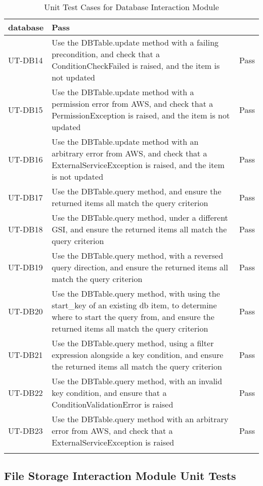 \documentclass[12pt, titlepage]{article}
\begin{document}
\begin{longtable}{|m{2cm}|m{10cm}|m{1.4cm}|}
  database & Pass\\ \hline
  UT-DB14 & Use the DBTable.update method with a failing
  precondition, and check that a ConditionCheckFailed is raised, and
  the item is not updated & Pass\\ \hline
  UT-DB15 & Use the DBTable.update method with a permission error
  from AWS, and check that a PermissionException is raised, and the
  item is not updated & Pass\\ \hline
  UT-DB16 & Use the DBTable.update method with an arbitrary error
  from AWS, and check that a ExternalServiceException is raised, and
  the item is not updated & Pass\\ \hline
  UT-DB17 & Use the DBTable.query method, and ensure the returned
  items all match the query criterion & Pass\\ \hline
  UT-DB18 & Use the DBTable.query method, under a different GSI, and
  ensure the returned items all match the query criterion & Pass\\ \hline
  UT-DB19 & Use the DBTable.query method, with a reversed query
  direction, and ensure the returned items all match the query
  criterion & Pass\\ \hline
  UT-DB20 & Use the DBTable.query method, with using the start\_key
  of an existing db item, to determine where to start the query from,
  and ensure the returned items all match the query criterion & Pass\\ \hline
  UT-DB21 & Use the DBTable.query method, using a filter expression
  alongside a key condition, and ensure the returned items all match
  the query criterion & Pass\\ \hline
  UT-DB22 & Use the DBTable.query method, with an invalid key
  condition, and ensure that a ConditionValidationError is raised &
  Pass\\ \hline
  UT-DB23 & Use the DBTable.query method with an arbitrary error
  from AWS, and check that a ExternalServiceException is raised & Pass\\ \hline
  \caption{Unit Test Cases for Database Interaction Module}
\end{longtable}

\subsection{File Storage Interaction Module Unit Tests}
\end{document}
